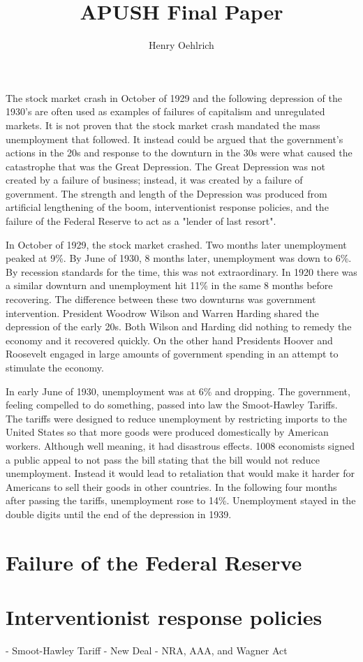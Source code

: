 \documentclass{article}
\title{APUSH Final Paper}
\author{Henry Oehlrich}
\begin{document}
\maketitle{}

The stock market crash in October of 1929 and the following depression of the
1930's are often used as examples of failures of capitalism and unregulated
markets. It is not proven that the stock market crash mandated the mass
unemployment that followed. It instead could be argued that the government's
actions in the 20s and response to the downturn in the 30s were what caused the
catastrophe that was the Great Depression. The Great Depression was not created
by a failure of business; instead, it was created by a failure of government.
The strength and length of the Depression was produced from artificial
lengthening of the boom, interventionist response policies, and the failure of
the Federal Reserve to act as a "lender of last resort".

In October of 1929, the stock market crashed. Two months later unemployment
peaked at 9\%. By June of 1930, 8 months later, unemployment was down to 6\%.
By recession standards for the time, this was not extraordinary. In 1920 there
was a similar downturn and unemployment hit 11\% in the same 8 months before
recovering. The difference between these two downturns was government
intervention. President Woodrow Wilson and Warren Harding shared the depression
of the early 20s. Both Wilson and Harding did nothing to remedy the economy and
it recovered quickly. On the other hand Presidents Hoover and Roosevelt engaged
in large amounts of government spending in an attempt to stimulate the economy.

In early June of 1930, unemployment was at 6\% and dropping. The government,
feeling compelled to do something, passed into law the Smoot-Hawley Tariffs.
The tariffs were designed to reduce unemployment by restricting imports to the
United States so that more goods were produced domestically by American
workers. Although well meaning, it had disastrous effects. 1008 economists
signed a public appeal to not pass the bill stating that the bill would not
reduce unemployment. Instead it would lead to retaliation that would make it
harder for Americans to sell their goods in other countries. In the following
four months after passing the tariffs, unemployment rose to 14\%. Unemployment
stayed in the double digits until the end of the depression in 1939.

\section{Failure of the Federal Reserve}

\section{Interventionist response policies}
- Smoot-Hawley Tariff
- New Deal
- NRA, AAA, and Wagner Act
\end{document}
